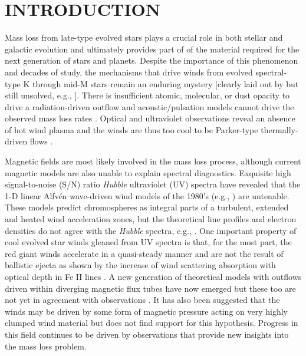 \documentclass[iop]{emulateapj}
\begin{document}

\section{INTRODUCTION}

Mass loss from late-type evolved stars plays a crucial role in both stellar and galactic evolution and ultimately provides part of of the material required for the next generation of stars and planets. Despite the importance of this phenomenon and decades of study, the mechanisms that drive winds from evolved spectral-type K through mid-M stars remain an enduring mystery [clearly laid out by \cite{1985ASSL..117..229H} but still unsolved, e.g., \citealt{2009AIPC.1094..267C}]. There is insufficient atomic, molecular, or dust opacity to drive a radiation-driven outflow and acoustic/pulsation models cannot drive the observed mass loss rates \citep{1995ApJ...442L..61S}. Optical and ultraviolet observations reveal an absence of hot wind plasma and the winds are thus too cool to be Parker-type thermally-driven flows \cite[e.g.,][]{1979ApJ...229L..27L,1981ApJ...250..293A}. 

Magnetic fields are most likely involved in the mass loss process, although current magnetic models are also unable to explain spectral diagnostics. Exquisite high signal-to-noise (S/N) ratio \textit{Hubble} ultraviolet (UV) spectra have revealed that the 1-D linear Alfv\'en wave-driven wind models of the 1980’s (e.g., \citealt{1980ApJ...242..260H,1988PhDT........13H}) are untenable. These models predict chromospheres as integral parts of a turbulent, extended and heated wind acceleration zones, but the theoretical line profiles and electron densities do not agree with the \textit{Hubble} spectra, e.g., \cite{1998ApJ...494..828J}. One important property of cool evolved star winds gleaned from UV spectra is that, for the most part, the red giant winds accelerate in a quasi-steady manner and are not the result of ballistic ejecta as shown by the increase of wind scattering absorption with optical depth in Fe II lines \citep{1999ApJ...521..382C}. A new generation of theoretical models with outflows driven within diverging magnetic flux tubes have now emerged \citep{2006MNRAS.368.1145F, 2007ApJ...659.1592S} but these too are not yet in agreement with observations \citep{2009AIPC.1094..267C}. It has also been suggested that the winds may be driven by some form of magnetic pressure acting on very highly clumped wind material \citep{2008AJ....136.1964E} but \cite{2010ApJ...720.1767H} does not find support for this hypothesis. Progress in this field continues to be driven by observations that provide new insights into the mass loss problem.
\end{document}
